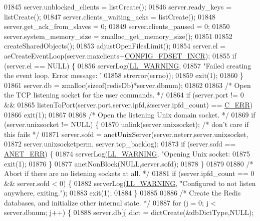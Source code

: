 \begin{DoxyCode}
{{{{{{{{{{{{{{{{{{{{{{{{{{01845     server.unblocked\_clients = listCreate();
01846     server.ready\_keys = listCreate();
01847     server.clients\_waiting\_acks = listCreate();
01848     server.get\_ack\_from\_slaves = 0;
01849     server.clients\_paused = 0;
01850     server.system\_memory\_size = zmalloc\_get\_memory\_size();
01851 
01852     createSharedObjects();
01853     adjustOpenFilesLimit();
01854     server.el = aeCreateEventLoop(server.maxclients+\hyperlink{server_8h_a6725c1ff5b6a17f930627263f484d107}{CONFIG\_FDSET\_INCR});
01855     \textcolor{keywordflow}{if} (server.el == NULL) \{
01856         serverLog(\hyperlink{server_8h_a31229b9334bba7d6be2a72970967a14b}{LL\_WARNING},
01857             \textcolor{stringliteral}{"Failed creating the event loop. Error message: '%
01858             strerror(errno));
01859         exit(1);
01860     \}
01861     server.db = zmalloc(\textcolor{keyword}{sizeof}(redisDb)*server.dbnum);
01862 
01863     \textcolor{comment}{/* Open the TCP listening socket for the user commands. */}
01864     \textcolor{keywordflow}{if} (server.port != 0 &&
01865         listenToPort(server.port,server.ipfd,&server.ipfd\_count) == \hyperlink{server_8h_af98ac28d5f4d23d7ed5985188e6fb7d1}{C\_ERR})
01866         exit(1);
01867 
01868     \textcolor{comment}{/* Open the listening Unix domain socket. */}
01869     \textcolor{keywordflow}{if} (server.unixsocket != NULL) \{
01870         unlink(server.unixsocket); \textcolor{comment}{/* don't care if this fails */}
01871         server.sofd = anetUnixServer(server.neterr,server.unixsocket,
01872             server.unixsocketperm, server.tcp\_backlog);
01873         \textcolor{keywordflow}{if} (server.sofd == \hyperlink{anet_8h_a0697b7774a7e0f4ef141839fe93536fe}{ANET\_ERR}) \{
01874             serverLog(\hyperlink{server_8h_a31229b9334bba7d6be2a72970967a14b}{LL\_WARNING}, \textcolor{stringliteral}{"Opening Unix socket: %
01875             exit(1);
01876         \}
01877         anetNonBlock(NULL,server.sofd);
01878     \}
01879 
01880     \textcolor{comment}{/* Abort if there are no listening sockets at all. */}
01881     \textcolor{keywordflow}{if} (server.ipfd\_count == 0 && server.sofd < 0) \{
01882         serverLog(\hyperlink{server_8h_a31229b9334bba7d6be2a72970967a14b}{LL\_WARNING}, \textcolor{stringliteral}{"Configured to not listen anywhere, exiting."});
01883         exit(1);
01884     \}
01885 
01886     \textcolor{comment}{/* Create the Redis databases, and initialize other internal state. */}
01887     \textcolor{keywordflow}{for} (j = 0; j < server.dbnum; j++) \{
01888         server.db[j].dict = dictCreate(&dbDictType,NULL);
}}}}}}}}}}}}}}}}}}}}}}}}}}}}
\end{DoxyCode}
